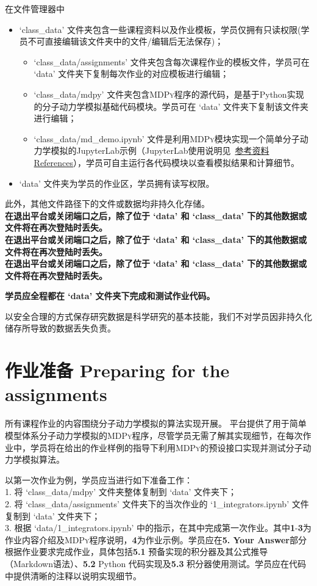\documentclass{article}
\begin{document}
在文件管理器中
\begin{itemize}
  \item `class\_data' 文件夹包含一些课程资料以及作业模板，学员仅拥有只读权限(学员不可直接编辑该文件夹中的文件/编辑后无法保存)；
    \begin{itemize}
      \item `class\_data/assignments' 文件夹包含每次课程作业的模板文件，学员可在 `data' 文件夹下复制每次作业的对应模板进行编辑；
      \item `class\_data/mdpy' 文件夹包含\textsc{MDPy}程序的源代码，是基于Python实现的分子动力学模拟基础代码模块。学员可在 `data' 文件夹下复制该文件夹进行编辑；
      \item `class\_data/md\_demo.ipynb' 文件是利用\textsc{MDPy}模块实现一个简单分子动力学模拟的JupyterLab示例（JupyterLab使用说明见~\hyperref[sec:ref]{参考资料 References}），学员可自主运行各代码模块以查看模拟结果和计算细节。
    \end{itemize}
  \item `data' 文件夹为学员的作业区，学员拥有读写权限。
\end{itemize}

此外，其他文件路径下的文件或数据均非持久化存储。\\
{\bf
\color{myred} 在退出平台或关闭端口之后，除了位于 `data' 和 `class\_data' 下的其他数据或文件将在再次登陆时丢失。\\
\color{myblue}在退出平台或关闭端口之后，除了位于 `data' 和 `class\_data' 下的其他数据或文件将在再次登陆时丢失。\\
\color{myred} 在退出平台或关闭端口之后，除了位于 `data' 和 `class\_data' 下的其他数据或文件将在再次登陆时丢失。}

{\bf 学员应全程都在 `data' 文件夹下完成和测试作业代码。}

以安全合理的方式保存研究数据是科学研究的基本技能，我们不对学员因非持久化储存所导致的数据丢失负责。

\section*{作业准备 Preparing for the assignments}

所有课程作业的内容围绕分子动力学模拟的算法实现开展。
平台提供了用于简单模型体系分子动力学模拟的\textsc{MDPy}程序，尽管学员无需了解其实现细节，在每次作业中，学员将在给出的作业样例的指导下利用\textsc{MDPy}的预设接口实现并测试分子动力学模拟算法。

以第一次作业为例，学员应当进行如下准备工作：\\
1. 将 `class\_data/mdpy' 文件夹整体复制到 `data' 文件夹下；\\
2. 将 `class\_data/assignments' 文件夹下的当次作业的 `1\_integrators.ipynb' 文件复制到 `data' 文件夹下；\\
3. 根据 `data/1\_integrators.ipynb' 中的指示，在其中完成第一次作业。其中\textbf{1}-\textbf{3}为作业内容介绍及\textsc{MDPy}程序说明，\textbf{4}为作业示例。学员应在\textbf{5. Your Answer}部分根据作业要求完成作业，具体包括\textbf{5.1} 预备实现的积分器及其公式推导（Markdown语法）、\textbf{5.2} Python 代码实现及\textbf{5.3} 积分器使用测试。学员应在代码中提供清晰的注释以说明实现细节。\\
\end{document}

